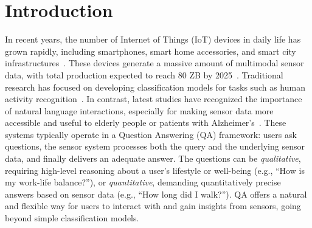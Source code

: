 \section{Introduction}
\label{sec:intro}





In recent years, the number of Internet of Things (IoT) devices in daily life has grown rapidly, including smartphones, smart home accessories, and smart city infrastructures~\cite{choi2021smart,khang2023smart}. These devices generate a massive amount of multimodal sensor data, with total production expected to reach 80 ZB by 2025~\cite{idc}. 
Traditional research has focused on developing classification models for tasks such as human activity recognition~\cite{ouyang2022cosmo, ouyang2023harmony, xu2023practically, xu2023mesen, cao2024mmclip, weng2024large}.
In contrast, latest studies have recognized the importance of natural language interactions, especially for making sensor data more accessible and useful to elderly people or patients with Alzheimer’s~\cite{xing2021deepsqa,nie2022ai,yang2024drhouse,arakawa2024prism,ji2024mindguard,chen2024sensor2text}.
These systems typically operate in a Question Answering (QA) framework: users ask questions, the sensor system processes both the query and the underlying sensor data, and finally delivers an adequate answer.
The questions can be \textit{qualitative}, requiring high-level reasoning about a user's lifestyle or well-being (e.g., “How is my work-life balance?”), or \textit{quantitative}, demanding quantitatively precise answers based on sensor data (e.g., “How long did I walk?”). 
QA offers a natural and flexible way for users to interact with and gain insights from sensors, going beyond simple classification models.



